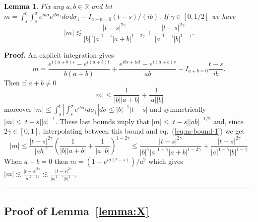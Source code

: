 \documentclass[a4paper,11pt,reqno]{article}
\newcommand{\RR}{\mathbb{R}}
\newtheorem{lemma}[theorem]{Lemma}
\newenvironment{proof}[1][Proof]{\textbf{#1.} }{\ \rule{0.5em}{0.5em}}
\begin{document}
\begin{lemma}
\label{lemma:M-bounds}
 Fix any $a,b \in \RR$ and let 
$
m = \int_s^t \int_s^\sigma e^{i a \sigma} e^{i b \sigma_1} d\sigma d\sigma_1 - I_{a+b=0} (t-s)/(ib)
$.
If $\gamma \in[0,1/2]$  we have
$$
|m| \lesssim\frac{|t-s|^{2\gamma}}{|b|^{\gamma}|a|^{1-\gamma}|a+b|^{1-2\gamma}}+\frac{|t-s|^{2\gamma}}{|a|^{1-\gamma}|b|^{1-\gamma}} .
$$  
\end{lemma}
\begin{proof}
An explicit integration gives
$$
m = \frac{e^{i(a+b)s}-e^{i(a+b)t}}{b (a+b)} 
+\frac{e^{i bs+iat}-e^{i(a+b)s}}{ab}  - I_{a+b=0} \frac{t-s}{ib}.
$$
Then if $a+b \neq 0$
\begin{equation}
  \label{eq:m-bound-1}
|m| \le \frac{1}{|b||a+b|}+\frac{1}{|a||b|}
\end{equation}
moreover
$
|m| \le  \int_s^t \left|\int_s^\sigma  e^{i b \sigma_1}
  d\sigma_1\right| d\sigma \le |b|^{-1}|t-s|  
$
and symmetrically $|m| \le |t-s| |a|^{-1}$. These last bounds imply
that  $|m| \le |t-s||ab|^{-1/2}$ and, since $2\gamma \in [0,1]$,  interpolating between this bound and
eq.~(\ref{eq:m-bound-1}) we get
\begin{equation}
  \label{eq:m-bound-3}
 |m| \le \frac{|t-s|^{2\gamma}}{|ab|^{\gamma}}
 \left(\frac{1}{|b||a+b|}+\frac{1}{|a||b|}\right)^{1-2\gamma} \le 
\frac{|t-s|^{2\gamma}}{|b|^{\gamma}|a|^{1-\gamma}|a+b|^{1-2\gamma}}+\frac{|t-s|^{2\gamma}}{|a|^{1-\gamma}|b|^{1-\gamma}}
\end{equation}
When $a+b=0$ then
$
m =   (1-e^{ia(t-s)})/a^2
$
which gives 
$
|m|\lesssim \frac{|t-s|^{2\gamma}}{|a|^{2-2\gamma}} \lesssim \frac{|t-s|^{2\gamma}}{|a|^{1-\gamma}|b|^{1-\gamma}} .
$
\end{proof}

\subsection{Proof of Lemma~\ref{lemma:X}}
\end{document}
